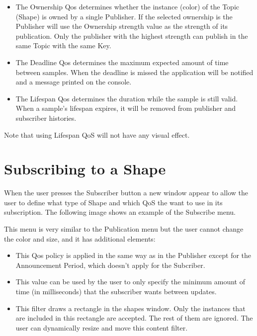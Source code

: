 \documentclass[letterpaper,10pt,english]{sphinxmanual}
\begin{document}
\begin{itemize}
\item {} 
 The Ownership Qos determines whether the instance (color) of the Topic (Shape) is owned by a single Publisher. If the selected ownership is  the Publisher will use the Ownership strength value as the strength of its publication. Only the publisher with the highest strength can publish in the same Topic with the same Key.

\item {} 
 The Deadline Qos determines the maximum expected amount of time between samples. When the deadline is missed the application will be notified and a message printed on the console.

\item {} 
 The Lifespan Qos determines the duration while the sample is still valid. When a sample’s lifespan expires, it will be removed from publisher and subscriber histories.

\end{itemize}

Note that using Lifespan QoS will not have any visual effect.


\section{Subscribing to a Shape}
\label{\detokenize{firststept:subscribing-to-a-shape}}
When the user presses the Subscriber button a new window appear to allow the user to define what type of Shape and which QoS the want to use in its subscription. The following image shows an example of the Subscribe menu.


This menu is very similar to the Publication menu but the user cannot change the color and size, and it has additional elements:
\begin{itemize}
\item {} 
 This Qos policy is applied in the same way as in the Publisher except for the Announcement Period, which doesn’t apply for the Subcriber.

\item {} 
 This value can be used by the user to only specify the minimum amount of time (in milliseconds) that the subscriber wants between updates.

\item {} 
 This filter draws a rectangle in the shapes window. Only the instances that are included in this rectangle are accepted. The rest of them are ignored. The user can dynamically resize and move this content filter.

\end{itemize}
\end{document}
